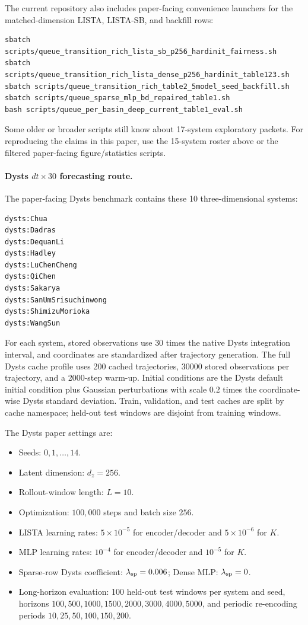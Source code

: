 The current repository also includes paper-facing convenience launchers for the
matched-dimension LISTA, LISTA-SB, and backfill rows:
\begin{verbatim}
sbatch scripts/queue_transition_rich_lista_sb_p256_hardinit_fairness.sh
sbatch scripts/queue_transition_rich_lista_dense_p256_hardinit_table123.sh
sbatch scripts/queue_transition_rich_table2_5model_seed_backfill.sh
sbatch scripts/queue_sparse_mlp_bd_repaired_table1.sh
bash scripts/queue_per_basin_deep_current_table1_eval.sh
\end{verbatim}

Some older or broader scripts still know about 17-system exploratory packets.
For reproducing the claims in this paper, use the 15-system roster above or the
filtered paper-facing figure/statistics scripts.

\paragraph{Dysts \(dt\times30\) forecasting route.}
The paper-facing Dysts benchmark contains these 10 three-dimensional systems:
\begin{verbatim}
dysts:Chua
dysts:Dadras
dysts:DequanLi
dysts:Hadley
dysts:LuChenCheng
dysts:QiChen
dysts:Sakarya
dysts:SanUmSrisuchinwong
dysts:ShimizuMorioka
dysts:WangSun
\end{verbatim}

For each system, stored observations use \(30\) times the native Dysts
integration interval, and coordinates are standardized after trajectory
generation. The full Dysts cache profile uses 200 cached trajectories, 30000
stored observations per trajectory, and a 2000-step warm-up. Initial conditions
are the Dysts default initial condition plus Gaussian perturbations with scale
\(0.2\) times the coordinate-wise Dysts standard deviation. Train, validation,
and test caches are split by cache namespace; held-out test windows are disjoint
from training windows.

The Dysts paper settings are:
\begin{itemize}
  \item Seeds: \(0,1,\ldots,14\).
  \item Latent dimension: \(d_z=256\).
  \item Rollout-window length: \(L=10\).
  \item Optimization: \(100{,}000\) steps and batch size \(256\).
  \item LISTA learning rates: \(5\times10^{-5}\) for encoder/decoder and
  \(5\times10^{-6}\) for \(K\).
  \item MLP learning rates: \(10^{-4}\) for encoder/decoder and \(10^{-5}\)
  for \(K\).
  \item Sparse-row Dysts coefficient: \(\lambda_{\rm sp}=0.006\); Dense MLP:
  \(\lambda_{\rm sp}=0\).
  \item Long-horizon evaluation: 100 held-out test windows per system and seed,
  horizons \(100,500,1000,1500,2000,3000,4000,5000\), and periodic
  re-encoding periods \(10,25,50,100,150,200\).
\end{itemize}

